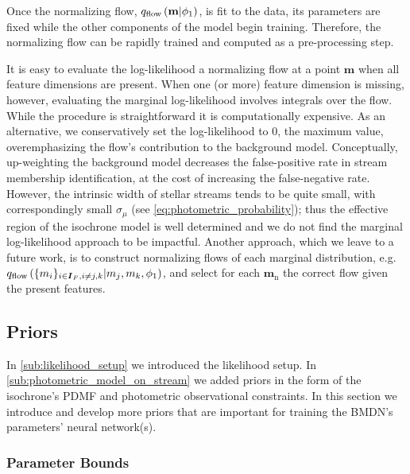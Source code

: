 \documentclass[twocolumn]{aastex631}
\newcommand{\mrm}[1]{\mathrm{#1}}
\newcommand{\mbs}[1]{\boldsymbol{#1}}
\newcommand{\nth}[1]{{#1}_{\mrm{n}}}  %
\begin{document}
            Once the normalizing flow, $q_{\rm flow}\left(\mathbf{m} | \phi_1\right)$, is fit to the data, its parameters are fixed while the other components of the model begin training. Therefore, the normalizing flow can be rapidly trained and computed as a pre-processing step.

            It is easy to evaluate the log-likelihood a normalizing flow at a point $\mbs{m}$ when all feature dimensions are present. When one (or more) feature dimension is missing, however, evaluating the marginal log-likelihood involves integrals over the flow. While the procedure is straightforward it is computationally expensive. As an alternative, we conservatively set the log-likelihood to $0$, the maximum value, overemphasizing the flow's contribution to the background model. Conceptually, up-weighting the background model decreases the false-positive rate in stream membership identification, at the
            cost of increasing the false-negative rate. However, the intrinsic width of stellar streams tends to be quite small, with correspondingly small $\sigma_\mu$ (see \autoref{eq:photometric_probability}); thus the effective region of the isochrone model is well determined and we do not find the marginal log-likelihood approach to be impactful. Another approach, which we leave to a future work, is to construct normalizing flows of each marginal distribution, e.g. $q_{\rm flow}\left(\{m_i\}_{i \in \mbs{I}_F, i \neq {j, k}} | m_j, m_k, \phi_1\right)$, and select for each $\nth{\mbs{m}}$ the correct flow given the present features.

    

    \subsection{Priors} \label{sub:priors}

        In \autoref{sub:likelihood_setup} we introduced the likelihood setup. In \autoref{sub:photometric_model_on_stream} we added priors in the form of the isochrone's PDMF and photometric observational constraints. In this section we
        introduce and develop more priors that are important for training the BMDN's parameters' neural network(s).

        \subsubsection{Parameter Bounds} \label{ssub:parameter_bounds}
\end{document}
